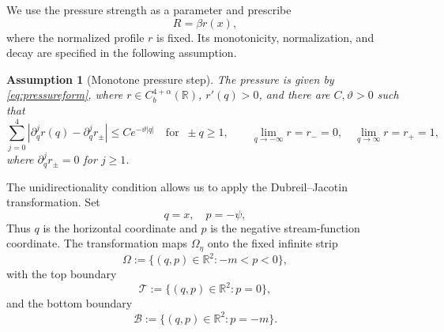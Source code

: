 \documentclass[12pt,letterpaper]{amsart}
\newtheorem{assumption}[theorem]{Assumption}
\numberwithin{equation}{section}
\def\R{{\mathbb R}}
\begin{document}
	{We use the pressure strength as a parameter and prescribe}
	\begin{equation}\label{eq:pressureform}
		 R=\beta r(x),
		\end{equation}
	 {where the normalized profile $r$ is fixed. Its monotonicity, normalization, and decay are specified in the following assumption.}
	\begin{assumption}[Monotone pressure step]\label{ass:pressure}
		The pressure is given by \eqref{eq:pressureform}, where
		\(r\in C_b^{4+\alpha}(\R)\), \(r'(q)>0\), and there are \(C,\vartheta>0\) such that
		\begin{equation*}
			\sum_{j=0}^4|{\partial_q^j r(q)-\partial_q^j r_\pm}|
			\le Ce^{-\vartheta |q|}\quad\text{for }\ \pm q\ge1,
			\qquad\lim_{q\to-\infty}r= r_-=0,\quad \lim_{q\to\infty}r=r_+=1,
		\end{equation*}
		where \(\partial_q^j r_\pm=0\) for \(j\ge1\).
	\end{assumption}
	
	
	
	
	{The unidirectionality condition allows us to apply the Dubreil--Jacotin transformation. Set}
	\begin{equation*}
		q=x,\quad p=-\psi,
	\end{equation*}
	{Thus $q$ is the horizontal coordinate and $p$ is the negative stream-function coordinate. The transformation maps $\Omega_\eta$ onto the fixed infinite strip}
	\begin{equation*}
		\Omega:=\{(q,p)\in\R^2:-m<p<0\},
	\end{equation*}
	with the top boundary
	\begin{equation*}
	\mathcal	T:=\{(q,p)\in\R^2:p=0\},
	\end{equation*}
	and the bottom boundary
	\begin{equation*}
	\mathcal	B:=\{(q,p)\in\R^2:p=-m\}.
	\end{equation*}
	
\end{document}
